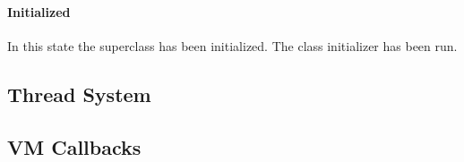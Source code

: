 \paragraph{Initialized} 
In this state the superclass has been initialized. The class initializer has 
been run. 

\JavaTMFooter

\JikesTMFooter

\subsection{Thread System}\label{sec:threads}



\subsection{VM Callbacks}\label{sssec:callbacks}



